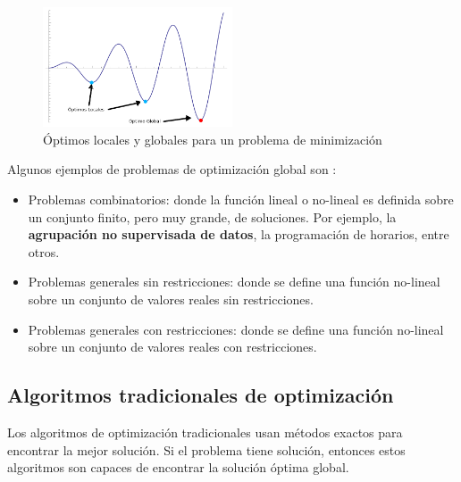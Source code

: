 \begin{figure}[h!]
  \centering
  \includegraphics[width=0.5\textwidth]{figures/maxmin.png}
  \caption{Óptimos locales y globales para un problema de minimización}
  \label{mopt:maxmin}
\end{figure}

    Algunos ejemplos de problemas de optimización global son \cite{GO_2}:
\begin{itemize}
    \item Problemas combinatorios: donde la función lineal o no-lineal es definida
sobre un conjunto finito, pero muy grande, de soluciones. Por ejemplo, la
\textbf{agrupación no supervisada de datos}, la programación de horarios, entre
otros.
    \item Problemas generales sin restricciones: donde se define una función
no-lineal sobre un conjunto de valores reales sin restricciones.
    \item Problemas generales con restricciones: donde se define una función
no-lineal sobre un conjunto de valores reales con restricciones.
\end{itemize}

\subsection{Algoritmos tradicionales de optimización}

    Los algoritmos de optimización tradicionales usan métodos exactos para
encontrar la mejor solución. Si el problema tiene solución, entonces estos algoritmos
son capaces de encontrar la solución óptima global.


